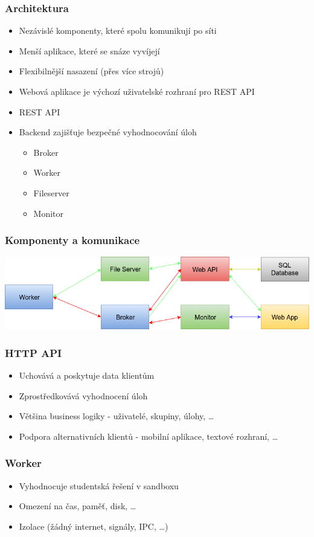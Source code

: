 \documentclass{beamer}
\begin{document}
\begin{frame}
	\frametitle{Architektura}
	\begin{itemize}
		\item Nezávislé komponenty, které spolu komunikují po síti
		\item Menší aplikace, které se snáze vyvíjejí
		\item Flexibilnější nasazení (přes více strojů)
		\item Webová aplikace je výchozí uživatelské rozhraní pro REST API
		\item REST API 
		\item Backend zajišťuje bezpečné vyhodnocování úloh
		\begin{itemize}
			\item Broker
			\item Worker
			\item Fileserver
			\item Monitor
		\end{itemize}
	\end{itemize}
\end{frame}

\begin{frame}
	\frametitle{Komponenty a komunikace}
	\begin{center}
		\includegraphics[width=1\textwidth]{images/communication.png}
	\end{center}
\end{frame}

\begin{frame}
	\frametitle{HTTP API}
	\begin{itemize}
		\item Uchovává a poskytuje data klientům
		\item Zprostředkovává vyhodnocení úloh
		\item Většina business logiky - uživatelé, skupiny, úlohy, \dots
		\item Podpora alternativních klientů - mobilní aplikace, textové rozhraní, \dots
	\end{itemize}
\end{frame}

\begin{frame}
	\frametitle{Worker}
	\begin{itemize}
		\item Vyhodnocuje studentská řešení v sandboxu
		\item Omezení na čas, paměť, disk, \dots
		\item Izolace (žádný internet, signály, IPC, \dots)
	\end{itemize}
\end{frame}
\end{document}
